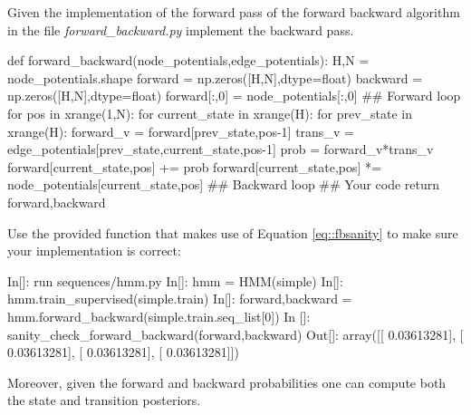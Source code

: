 \begin{exercise}
Given the implementation of the forward pass of the forward backward
algorithm in the file \emph{forward\_backward.py} implement the backward pass.
\begin{python}

def forward_backward(node_potentials,edge_potentials):
    H,N = node_potentials.shape
    forward = np.zeros([H,N],dtype=float)
    backward = np.zeros([H,N],dtype=float)
    forward[:,0] = node_potentials[:,0]
    ## Forward loop
    for pos in xrange(1,N):
        for current_state in xrange(H):
            for prev_state in xrange(H):
                forward_v = forward[prev_state,pos-1]
                trans_v = edge_potentials[prev_state,current_state,pos-1]
                prob = forward_v*trans_v
                forward[current_state,pos] += prob
            forward[current_state,pos] *= node_potentials[current_state,pos]
    ## Backward loop
          ## Your code
   return forward,backward

\end{python}

Use the provided function that makes use of Equation \ref{eq::fbsanity} to make
sure your implementation is correct:
 
\begin{python}
In[]:  run sequences/hmm.py
In[]: hmm = HMM(simple)
In[]: hmm.train_supervised(simple.train)
In[]: forward,backward =  hmm.forward_backward(simple.train.seq_list[0])
In []: sanity_check_forward_backward(forward,backward)
Out[]: 
array([[ 0.03613281],
       [ 0.03613281],
       [ 0.03613281],
       [ 0.03613281]])
\end{python}
\end{exercise}

Moreover, given the forward and backward probabilities one can compute both the state
and transition posteriors.

